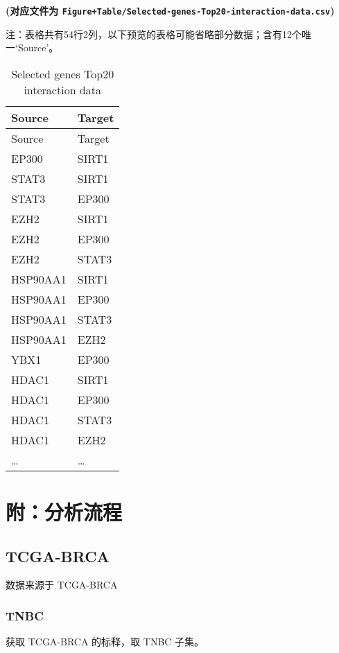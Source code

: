 \documentclass[
]{article}
\begin{document}
\textbf{(对应文件为 \texttt{Figure+Table/Selected-genes-Top20-interaction-data.csv})}

\begin{center}\begin{tcolorbox}[colback=gray!10, colframe=gray!50, width=0.9\linewidth, arc=1mm, boxrule=0.5pt]注：表格共有54行2列，以下预览的表格可能省略部分数据；含有12个唯一`Source'。
\end{tcolorbox}
\end{center}

\begin{longtable}[]{@{}ll@{}}
\caption{\label{tab:Selected-genes-Top20-interaction-data}Selected genes Top20 interaction data}\tabularnewline
\toprule
Source & Target\tabularnewline
\midrule
\endfirsthead
\toprule
Source & Target\tabularnewline
\midrule
\endhead
EP300 & SIRT1\tabularnewline
STAT3 & SIRT1\tabularnewline
STAT3 & EP300\tabularnewline
EZH2 & SIRT1\tabularnewline
EZH2 & EP300\tabularnewline
EZH2 & STAT3\tabularnewline
HSP90AA1 & SIRT1\tabularnewline
HSP90AA1 & EP300\tabularnewline
HSP90AA1 & STAT3\tabularnewline
HSP90AA1 & EZH2\tabularnewline
YBX1 & EP300\tabularnewline
HDAC1 & SIRT1\tabularnewline
HDAC1 & EP300\tabularnewline
HDAC1 & STAT3\tabularnewline
HDAC1 & EZH2\tabularnewline
\ldots{} & \ldots{}\tabularnewline
\bottomrule
\end{longtable}

\begin{center}\vspace{1.5cm}\end{center}

\hypertarget{workflow2}{%
\section{附：分析流程}\label{workflow2}}

\hypertarget{tcga-brca}{%
\subsection{TCGA-BRCA}\label{tcga-brca}}

数据来源于 TCGA-BRCA

\hypertarget{tnbc}{%
\subsubsection{TNBC}\label{tnbc}}

获取 TCGA-BRCA 的标释，取 TNBC 子集。
\end{document}
